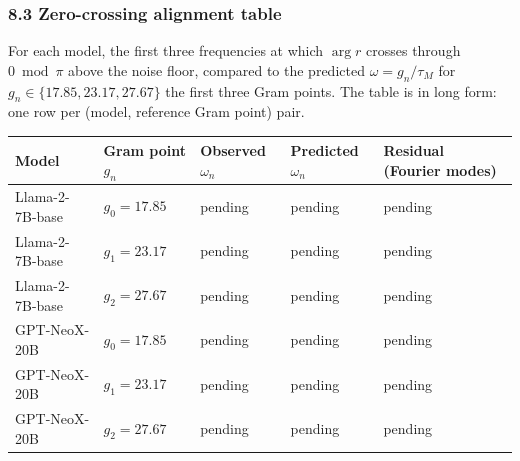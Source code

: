 \documentclass[
  letterpaper,
  11pt]{article}
\newcounter{none} %
\theoremstyle{plain}
\theoremstyle{definition}
\theoremstyle{remark}
\begin{document}
\subsubsection{8.3 Zero-crossing alignment table}\label{zero-crossing-alignment-table}

For each model, the first three frequencies at which \(\arg r\) crosses through \(0 \bmod \pi\) above the noise floor, compared to the predicted \(\omega = g_n / \tau_M\) for \(g_n \in \{17.85, 23.17, 27.67\}\) the first three Gram points. The table is in long form: one row per (model, reference Gram point) pair.

{\def\LTcaptype{none} %
\begin{longtable}[]{@{}
  >{\raggedright\arraybackslash}p{}
  >{\raggedleft\arraybackslash}p{}
  >{\raggedleft\arraybackslash}p{}
  >{\raggedleft\arraybackslash}p{}
  >{\raggedleft\arraybackslash}p{}@{}}
\toprule\noalign{}
\begin{minipage}[b]{\linewidth}\raggedright
Model
\end{minipage} & \begin{minipage}[b]{\linewidth}\raggedleft
Gram point \(g_n\)
\end{minipage} & \begin{minipage}[b]{\linewidth}\raggedleft
Observed \(\omega_n\)
\end{minipage} & \begin{minipage}[b]{\linewidth}\raggedleft
Predicted \(\omega_n\)
\end{minipage} & \begin{minipage}[b]{\linewidth}\raggedleft
Residual (Fourier modes)
\end{minipage} \\
\midrule\noalign{}
\endhead
\bottomrule\noalign{}
\endlastfoot
Llama-2-7B-base & \(g_0 = 17.85\) & pending & pending & pending \\
Llama-2-7B-base & \(g_1 = 23.17\) & pending & pending & pending \\
Llama-2-7B-base & \(g_2 = 27.67\) & pending & pending & pending \\
GPT-NeoX-20B & \(g_0 = 17.85\) & pending & pending & pending \\
GPT-NeoX-20B & \(g_1 = 23.17\) & pending & pending & pending \\
GPT-NeoX-20B & \(g_2 = 27.67\) & pending & pending & pending \\

\end{longtable}}
\end{document}
